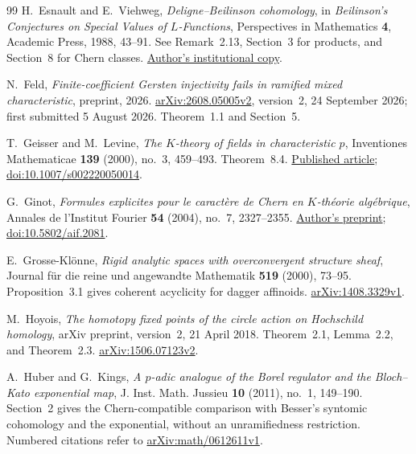 \documentclass[11pt,a4paper]{amsart}
\numberwithin{equation}{section}
\theoremstyle{definition}
\theoremstyle{remark}
\begin{document}
\begin{thebibliography}{99}
H.~Esnault and E.~Viehweg, \emph{Deligne--Beilinson cohomology}, in \emph{Beilinson's Conjectures on Special Values of $L$-Functions}, Perspectives in Mathematics \textbf{4}, Academic Press, 1988, 43--91. See Remark~2.13, Section~3 for products, and Section~8 for Chern classes.
\href{https://page.mi.fu-berlin.de/esnault/preprints/helene/13-deligne_beilinson.pdf}{Author's institutional copy}.

N.~Feld, \emph{Finite-coefficient Gersten injectivity fails in ramified mixed
characteristic}, preprint, 2026.
\href{https://arxiv.org/abs/2608.05005v2}{arXiv:2608.05005v2},
version~2, 24 September 2026; first submitted 5 August 2026.
Theorem~1.1 and Section~5.

T.~Geisser and M.~Levine, \emph{The $K$-theory of fields in
characteristic $p$}, Inventiones Mathematicae \textbf{139}
(2000), no.~3, 459--493. Theorem~8.4.
\href{https://www2.rikkyo.ac.jp/web/geisser/p-part.pdf}{Published article};
\href{https://doi.org/10.1007/s002220050014}{doi:10.1007/s002220050014}.

G.~Ginot, \emph{Formules explicites pour le caract\`ere de Chern en $K$-th\'eorie alg\'ebrique}, Annales de l'Institut Fourier \textbf{54} (2004), no.~7, 2327--2355.
\href{https://www.math.univ-paris13.fr/~ginot/papers/flecarch.pdf}{Author's preprint};
\href{https://doi.org/10.5802/aif.2081}{doi:10.5802/aif.2081}.

E.~Grosse-Kl\"onne, \emph{Rigid analytic spaces with overconvergent structure sheaf}, Journal f\"ur die reine und angewandte Mathematik \textbf{519} (2000), 73--95. Proposition~3.1 gives coherent acyclicity for dagger affinoids.
\href{https://arxiv.org/abs/1408.3329v1}{arXiv:1408.3329v1}.

M.~Hoyois, \emph{The homotopy fixed points of the circle action on
Hochschild homology}, arXiv preprint, version~2, 21 April 2018.
Theorem~2.1, Lemma~2.2, and Theorem~2.3.
\href{https://arxiv.org/abs/1506.07123v2}{arXiv:1506.07123v2}.

A.~Huber and G.~Kings, \emph{A $p$-adic analogue of the Borel regulator and the Bloch--Kato exponential map},
J. Inst. Math. Jussieu \textbf{10} (2011), no.~1, 149--190.
Section~2 gives the Chern-compatible comparison with Besser's
syntomic cohomology and the exponential, without an unramifiedness restriction.
Numbered citations refer to
\href{https://arxiv.org/abs/math/0612611v1}{arXiv:math/0612611v1}.


\end{thebibliography}
\end{document}
